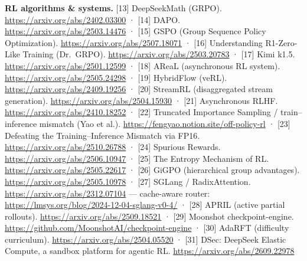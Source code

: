 \documentclass[
  paper=a4,
  ,captions=tableheading
]{scrartcl}
\begin{document}
\scriptsize

\textbf{RL algorithms \& systems.} {[}13{]} DeepSeekMath (GRPO).
\url{https://arxiv.org/abs/2402.03300} · {[}14{]} DAPO.
\url{https://arxiv.org/abs/2503.14476} · {[}15{]} GSPO (Group Sequence
Policy Optimization). \url{https://arxiv.org/abs/2507.18071} · {[}16{]}
Understanding R1-Zero-Like Training (Dr.~GRPO).
\url{https://arxiv.org/abs/2503.20783} · {[}17{]} Kimi k1.5.
\url{https://arxiv.org/abs/2501.12599} · {[}18{]} AReaL (asynchronous RL
system). \url{https://arxiv.org/abs/2505.24298} · {[}19{]} HybridFlow
(veRL). \url{https://arxiv.org/abs/2409.19256} · {[}20{]} StreamRL
(disaggregated stream generation).
\url{https://arxiv.org/abs/2504.15930} · {[}21{]} Asynchronous RLHF.
\url{https://arxiv.org/abs/2410.18252} · {[}22{]} Truncated Importance
Sampling / train--inference mismatch (Yao et al.).
\url{https://fengyao.notion.site/off-policy-rl} · {[}23{]} Defeating the
Training--Inference Mismatch via FP16.
\url{https://arxiv.org/abs/2510.26788} · {[}24{]} Spurious Rewards.
\url{https://arxiv.org/abs/2506.10947} · {[}25{]} The Entropy Mechanism
of RL. \url{https://arxiv.org/abs/2505.22617} · {[}26{]} GiGPO
(hierarchical group advantages). \url{https://arxiv.org/abs/2505.10978}
· {[}27{]} SGLang / RadixAttention.
\url{https://arxiv.org/abs/2312.07104} --- cache-aware router:
\url{https://lmsys.org/blog/2024-12-04-sglang-v0-4/} · {[}28{]} APRIL
(active partial rollouts). \url{https://arxiv.org/abs/2509.18521} ·
{[}29{]} Moonshot checkpoint-engine.
\url{https://github.com/MoonshotAI/checkpoint-engine} · {[}30{]} AdaRFT
(difficulty curriculum). \url{https://arxiv.org/abs/2504.05520} ·
{[}31{]} DSec: DeepSeek Elastic Compute, a sandbox platform for agentic
RL. \url{https://arxiv.org/abs/2609.22978}
\end{document}
